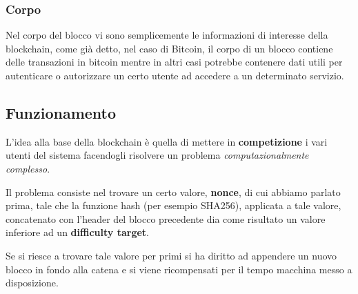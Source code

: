 \documentclass[11pt, a4paper]{article}
\begin{document}
\subsubsection{Corpo}
Nel corpo del blocco vi sono semplicemente le informazioni di interesse della blockchain, come già detto, nel caso
di Bitcoin, il corpo di un blocco contiene delle transazioni in bitcoin mentre in altri casi potrebbe contenere
dati utili per autenticare o autorizzare un certo utente ad accedere a un determinato servizio.

\subsection{Funzionamento}
L'idea alla base della blockchain è quella di mettere in \textbf{competizione} i vari utenti del sistema facendogli
risolvere un problema \emph{computazionalmente complesso}.

Il problema consiste nel trovare un certo valore, \textbf{nonce}, di cui abbiamo parlato prima, tale che la funzione
hash (per esempio SHA256), applicata a tale valore, concatenato con l'header del blocco precedente dia come
risultato un valore inferiore ad un \textbf{difficulty target}.

Se si riesce a trovare tale valore per primi si ha diritto ad appendere un nuovo blocco in fondo alla catena e si
viene ricompensati per il tempo macchina messo a disposizione.
\end{document}

